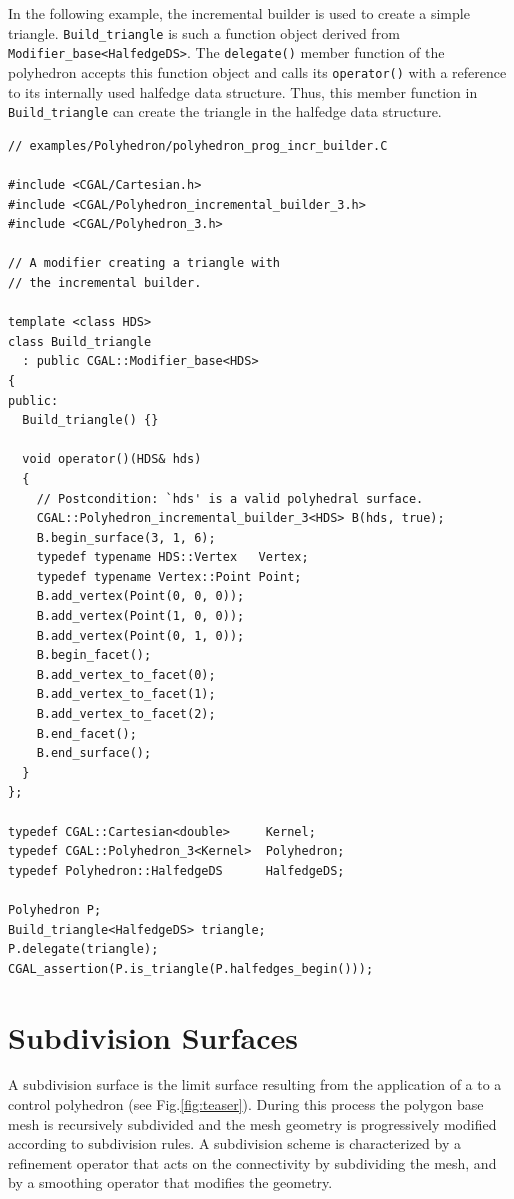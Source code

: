 \documentclass[letter,twoside,10pt]{article}
\begin{document}
In the following example, the incremental builder is used to create a
simple triangle. \verb+Build_triangle+ is such a function object
derived from \verb+Modifier_base<HalfedgeDS>+. The
\verb+delegate()+ member function of the polyhedron accepts this function
object and calls its \verb+operator()+ with a reference to its
internally used halfedge data structure. Thus, this member function in
\verb+Build_triangle+ can create the triangle in the 
halfedge data structure.

{ \scriptsize
\begin{verbatim}
// examples/Polyhedron/polyhedron_prog_incr_builder.C

#include <CGAL/Cartesian.h>
#include <CGAL/Polyhedron_incremental_builder_3.h>
#include <CGAL/Polyhedron_3.h>

// A modifier creating a triangle with 
// the incremental builder.

template <class HDS>
class Build_triangle
  : public CGAL::Modifier_base<HDS> 
{
public:
  Build_triangle() {}

  void operator()(HDS& hds) 
  {
    // Postcondition: `hds' is a valid polyhedral surface.
    CGAL::Polyhedron_incremental_builder_3<HDS> B(hds, true);
    B.begin_surface(3, 1, 6);
    typedef typename HDS::Vertex   Vertex;
    typedef typename Vertex::Point Point;
    B.add_vertex(Point(0, 0, 0));
    B.add_vertex(Point(1, 0, 0));
    B.add_vertex(Point(0, 1, 0));
    B.begin_facet();
    B.add_vertex_to_facet(0);
    B.add_vertex_to_facet(1);
    B.add_vertex_to_facet(2);
    B.end_facet();
    B.end_surface();
  }
};

typedef CGAL::Cartesian<double>     Kernel;
typedef CGAL::Polyhedron_3<Kernel>  Polyhedron;
typedef Polyhedron::HalfedgeDS      HalfedgeDS;

Polyhedron P;
Build_triangle<HalfedgeDS> triangle;
P.delegate(triangle);
CGAL_assertion(P.is_triangle(P.halfedges_begin()));

\end{verbatim}}

\section{Subdivision Surfaces}

A subdivision surface is the limit surface resulting from the
application of a  to a control polyhedron
(see Fig.\ref{fig:teaser}). During this process the polygon base
mesh is recursively subdivided and the mesh geometry is progressively
modified according to subdivision rules. A subdivision scheme is
characterized by a refinement operator that acts on the connectivity
by subdividing the mesh, and by a smoothing operator that modifies the
geometry. 
\end{document}
